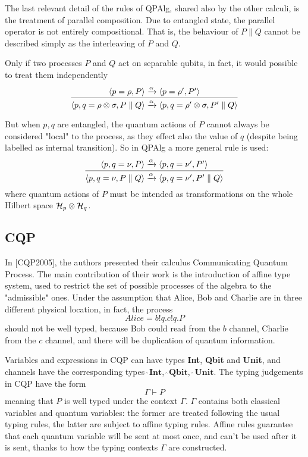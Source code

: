 
The last relevant detail of the rules of QPAlg, shared also by the other calculi, is the treatment of parallel composition. Due to entangled state, the parallel operator is not entirely compositional. That is, the behaviour of $P\parallel Q$ cannot be described simply as the interleaving of $P$ and $Q$.

Only if two processes $P$ and $Q$ act on separable qubits, in fact, it would possible to treat them independently
\[ \infer{\langle p,q=\rho\otimes\sigma, P\parallel Q\rangle \xrightarrow{\alpha} \langle p,q=\rho'\otimes\sigma, P'\parallel Q\rangle}{\langle p=\rho, P\rangle \xrightarrow{\alpha} \langle p=\rho', P'\rangle}\]


But when $p, q$ are entangled, the quantum actions of $P$ cannot always be considered "local" to the process, as they effect also the value of $q$ (despite being labelled as internal transition). So in QPAlg a more general rule is used:
\[\infer{\langle p,q=\nu, P\parallel Q\rangle \xrightarrow{\alpha} \langle p,q=\nu', P'\parallel Q\rangle}{\langle p, q=\nu, P\rangle \xrightarrow{\alpha} \langle p, q=\nu', P'\rangle}\]
where quantum actions of $P$ must be intended as transformations on the whole Hilbert space $\mathcal{H}_p \otimes \mathcal{H}_q$.



\subsection{CQP}


In [CQP2005], the authors presented their calculus Communicating Quantum Process. The main contribution of their work is the introduction of affine type system, used to restrict the set of possible processes of the algebra to the "admissible" ones. Under the assumption that Alice, Bob and Charlie are in three different physical location, in fact, the process \[Alice = b!q.c!q.P\] should not be well typed, because Bob could read from the $b$ channel, Charlie from the $c$ channel, and there will be duplication of quantum information. 


Variables and expressions in CQP can have types \textbf{Int}, \textbf{Qbit} and \textbf{Unit}, and channels have the corresponding types $\widehat{\ }\textbf{Int}$, $\widehat{\ }\textbf{Qbit}$, $\widehat{\ }\textbf{Unit}$.
The typing judgements in CQP have the form \[\Gamma \vdash P\] meaning that $P$ is well typed under the context $\Gamma$. $\Gamma$ contains both classical variables and quantum variables: the former are treated following the usual typing rules, the latter are subject to affine typing rules. Affine rules guarantee that each quantum variable will be sent at most once, and can't be used after it is sent, thanks to how the typing contexts $\Gamma$ are constructed.


